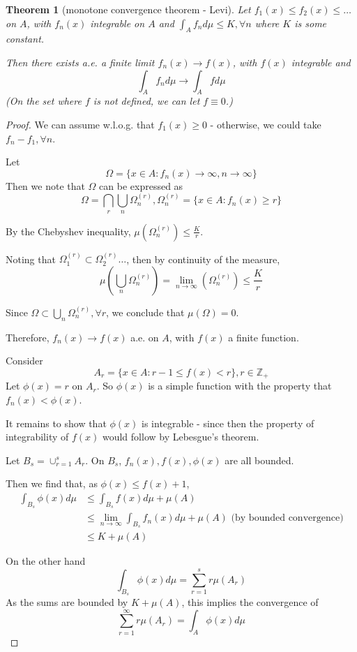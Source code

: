 \documentclass[11pt,a4paper]{report}
\theoremstyle{plain}
\newtheorem{thm}{Theorem}[section]
\theoremstyle{definition}
\theoremstyle{remark}
\newcommand{\union}{\cup}
\newcommand{\Union}{\bigcup}
\newcommand{\Intersection}{\bigcap}
\newcommand{\Z}{\mathbb{Z}}
\begin{document}
\begin{thm}[monotone convergence theorem - Levi]

    Let $f_1(x) \le f_2(x) \le \dots$ on $A$, with $f_n(x)$ integrable on $A$ and $\int_A f_n d\mu \le K, \forall n$ where $K$ is some constant.

    Then there exists a.e. a finite limit $f_n(x) \rightarrow f(x)$, with $f(x)$ integrable and 
    $$ \int_A f_n d\mu \rightarrow \int_A f d\mu $$
    (On the set where $f$ is not defined, we can let $f \equiv 0$.)
\end{thm}

\begin{proof}
    We can assume w.l.o.g. that $f_1(x) \ge 0$ - otherwise, we could take $f_n - f_1, \forall n$.

    Let 
    $$\Omega = \{ x \in A : f_n(x) \rightarrow \infty, n \rightarrow \infty \}$$
    Then we note that $\Omega$ can be expressed as
    $$\Omega = \Intersection_r \Union_n \Omega_n^{(r)}, \Omega_n^{(r)} = \{ x \in A : f_n(x) \ge r \} $$

    By the Chebyshev inequality, $\mu(\Omega_n^{(r)}) \le \frac{K}{r}$.

    Noting that $\Omega_1^{(r)} \subset \Omega_2^{(r)} \dots$, then by continuity of the measure,
    $$ \mu(\Union_n \Omega_n^{(r)}) = \lim_{n \rightarrow \infty}(\Omega_n^{(r)}) \le \frac{K}{r} $$

    Since $\Omega \subset \Union_n \Omega_n^{(r)}, \forall r$, we conclude that $\mu(\Omega) = 0$.

    Therefore, $f_n(x) \rightarrow f(x)$ a.e. on $A$, with $f(x)$ a finite function.

    Consider
    $$A_r = \{ x \in A : r - 1 \le f(x) < r \}, r \in \Z_{+}$$
    Let $\phi(x)  = r$ on $A_r$. So $\phi(x)$ is a simple function with the property that $f_n(x) < \phi(x)$.

    It remains to show that $\phi(x)$ is integrable - since then the property of integrability of $f(x)$ would follow by Lebesgue's theorem.

    Let $ B_s = \union_{r=1}^s A_r $. On $B_s$, $f_n(x), f(x), \phi(x)$ are all bounded.

    Then we find that, as $\phi(x) \le f(x) + 1$,
    \begin{align*}
        \int_{B_s} \phi(x) d\mu &\le \int_{B_s} f(x) d\mu + \mu(A) \\
                                &\le \lim_{n \rightarrow \infty} \int_{B_s} f_n(x) d\mu + \mu(A) \text{ (by bounded convergence)} \\
                                &\le K + \mu(A)
    \end{align*}

    On the other hand
    $$ \int_{B_s} \phi(x) d\mu = \sum_{r=1}^s r \mu(A_r) $$
    As the sums are bounded by $K + \mu(A)$, this implies the convergence of
    $$ \sum_{r=1}^\infty r \mu(A_r) = \int_A \phi(x) d\mu $$
\end{proof}
\end{document}
